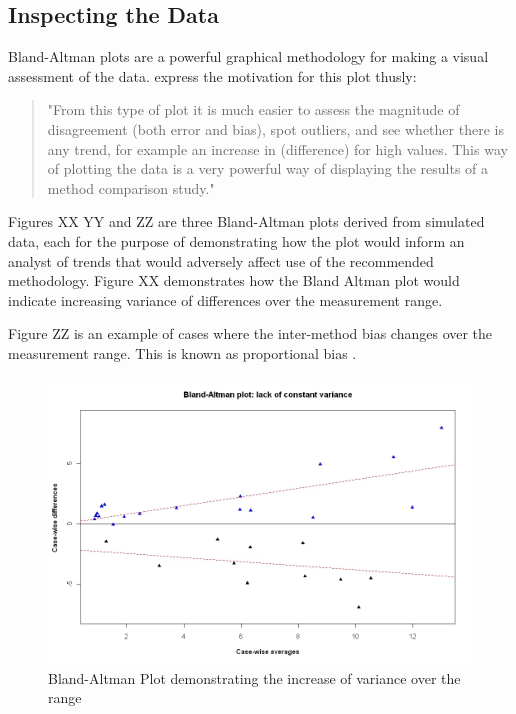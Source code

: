 \documentclass[12pt, a4paper]{report}
\begin{document}
\subsection{Inspecting the Data}
Bland-Altman plots are a powerful graphical methodology for making a visual assessment of the data. \citet*{BA83} express the
motivation for this plot thusly:
\begin{quote}
"From this type of plot it is much easier to assess the magnitude of disagreement (both error and bias), spot outliers, and see
whether there is any trend, for example an increase in (difference) for high values. This way of plotting the data is a
very powerful way of displaying the results of a method comparison study."
\end{quote}


Figures XX YY and ZZ are three Bland-Altman plots derived from simulated data, each for the purpose of demonstrating how the plot
would inform an analyst of trends that would adversely affect use of the recommended methodology. Figure XX demonstrates how the
Bland Altman plot would indicate increasing variance of differences over the measurement range.

Figure ZZ is an example of cases where the inter-method bias changes over the measurement range. This is known as proportional
bias \citep{ludbrook97}.

\newpage
\begin{figure}[h!]
\begin{center}
  \includegraphics[width=125mm]{BAFanEffect.jpeg}
  \caption{Bland-Altman Plot demonstrating the increase of variance over the range}\label{BAFanEffect}
\end{center}
\end{figure}
\end{document}
